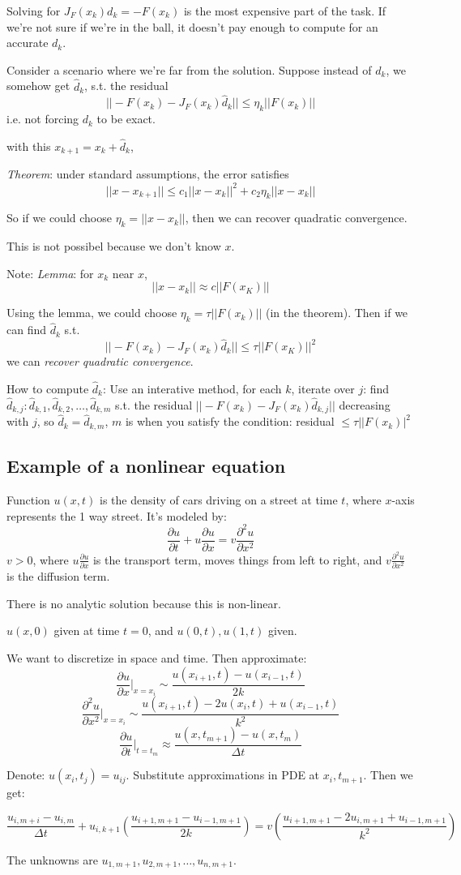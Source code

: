 Solving for $J_F(x_k)d_k = -F(x_k)$ is the most expensive part of the
task. If we're not sure if we're in the ball, it doesn't pay enough to
compute for an accurate $d_k$.

Consider a scenario where we're far from the solution. Suppose instead
of $d_k$, we somehow get $\hat d_k$, s.t. the residual $$||-F(x_k) - J_F(x_k)\hat
d_k||\le \eta_k||F(x_k)||$$
i.e. not forcing $d_k$ to be exact.

with this $x_{k+1} = x_k + \hat d_k$,

\emph{Theorem}: under standard assumptions, the error satisfies
$$||x-x_{k+1}|| \le c_1||x-x_k||^2 + c_2\eta_k||x-x_k||$$

So if we could choose $\eta_k = ||x-x_k||$, then we can recover quadratic
convergence.

This is not possibel because we don't know $x$.

Note:
\emph{Lemma}: for $x_k$ near $x$, $$||x-x_k|| \approx c ||F(x_K)||$$

Using the lemma, we could choose $\eta_k = \tau ||F(x_k)||$ (in the
theorem). Then if we can find $\hat d_k$
s.t. $$||-F(x_k) - J_F(x_k)\hat d_k|| \le \tau||F(x_K)||^2$$
we can \emph{recover quadratic convergence}.

How to compute $\hat d_k$:
Use an interative method, for each $k$, iterate over $j$: find $\hat d_{k,j}:\hat d_{k,1}, \hat
d_{k,2}, \dots, \hat d_{k,m}$ s.t. the residual $||-F(x_k) -
J_F(x_k)\hat d_{k,j}||$ decreasing with $j$, so $\hat d_k = \hat
d_{k,m}$, $m$ is when you satisfy the condition: residual $\le \tau
||F(x_k)|^2$

\subsection{Example of a nonlinear equation}
Function $u(x,t)$ is the density of cars driving on a street at time
$t$, where $x$-axis represents the 1 way street.
It's modeled by: $$\frac{\partial u}{\partial t} + u\frac{\partial
  u}{\partial x} = v\frac{\partial^2 u}{\partial x^2}$$
$v>0$, where $u\frac{\partial u}{\partial x}$ is the transport term, moves
things from left to right, and $v\frac{\partial^2 u}{\partial x^2}$ is
the diffusion term.

There is no analytic solution because this is non-linear.

$u(x,0)$ given at time $t=0$, and $u(0,t), u(1,t)$ given.

We want to discretize in space and time. Then approximate:
$$\frac{\partial u}{\partial x}|_{x=x_i} \sim \frac{u(x_{i+1}, t) -
  u(x_{i-1},t)}{2k}$$
$$\frac{\partial^2 u}{\partial x^2}|_{x=x_i} \sim \frac{u(x_{i+1}, t)
  -2u(x_i,t) + u(x_{i-1},t)}{k^2}$$
$$\frac{\partial u}{\partial t}|_{t=t_m} \approx \frac{u(x, t_{m+1}) -
  u(x,t_m)}{\Delta t}$$

Denote: $u(x_i, t_j) = u_{ij}$. Substitute approximations in PDE at
$x_i, t_{m+1}$. Then we get:

$$\frac{u_{i,m+i} - u_{i,m}}{\Delta t} +
u_{i,k+1}(\frac{u_{i+1,m+1}-u_{i-1,m+1}}{2k}) = v
  (\frac{u_{i+1,m+1}-2u_{i,m+1} +u_{i-1,m+1}}{k^2})$$

The unknowns are $u_{1,m+1}, u_{2,m+1}, \dots, u_{n,m+1}$.


